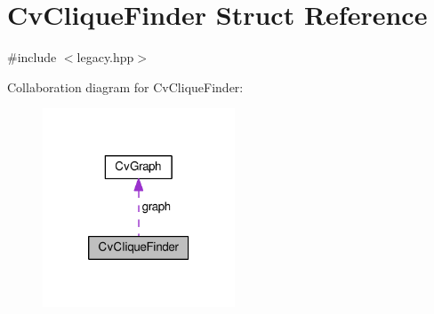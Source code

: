 \hypertarget{structCvCliqueFinder}{\section{Cv\-Clique\-Finder Struct Reference}
\label{structCvCliqueFinder}
}


{\ttfamily \#include $<$legacy.\-hpp$>$}



Collaboration diagram for Cv\-Clique\-Finder\-:\nopagebreak
\begin{figure}[H]
\begin{center}
\leavevmode
\includegraphics[width=162pt]{structCvCliqueFinder__coll__graph}
\end{center}
\end{figure}
